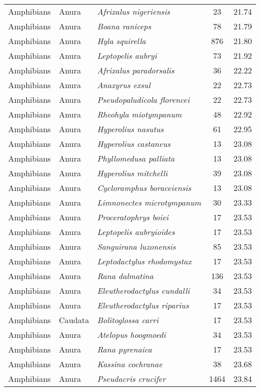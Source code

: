 \begin{longtable}{ll>{\itshape}lcc}
  Amphibians & Anura & Afrixalus nigeriensis &  23 & 21.74 \\ 
  Amphibians & Anura & Boana raniceps &  78 & 21.79 \\ 
  Amphibians & Anura & Hyla squirella & 876 & 21.80 \\ 
  Amphibians & Anura & Leptopelis aubryi &  73 & 21.92 \\ 
  Amphibians & Anura & Afrixalus paradorsalis &  36 & 22.22 \\ 
  Amphibians & Anura & Anaxyrus exsul &  22 & 22.73 \\ 
  Amphibians & Anura & Pseudopaludicola florencei &  22 & 22.73 \\ 
  Amphibians & Anura & Rheohyla miotympanum &  48 & 22.92 \\ 
  Amphibians & Anura & Hyperolius nasutus &  61 & 22.95 \\ 
  Amphibians & Anura & Hyperolius castaneus &  13 & 23.08 \\ 
  Amphibians & Anura & Phyllomedusa palliata &  13 & 23.08 \\ 
  Amphibians & Anura & Hyperolius mitchelli &  39 & 23.08 \\ 
  Amphibians & Anura & Cycloramphus boraceiensis &  13 & 23.08 \\ 
  Amphibians & Anura & Limnonectes microtympanum &  30 & 23.33 \\ 
  Amphibians & Anura & Proceratophrys boiei &  17 & 23.53 \\ 
  Amphibians & Anura & Leptopelis aubryioides &  17 & 23.53 \\ 
  Amphibians & Anura & Sanguirana luzonensis &  85 & 23.53 \\ 
  Amphibians & Anura & Leptodactylus rhodomystax &  17 & 23.53 \\ 
  Amphibians & Anura & Rana dalmatina & 136 & 23.53 \\ 
  Amphibians & Anura & Eleutherodactylus cundalli &  34 & 23.53 \\ 
  Amphibians & Anura & Eleutherodactylus riparius &  17 & 23.53 \\ 
  Amphibians & Caudata & Bolitoglossa carri &  17 & 23.53 \\ 
  Amphibians & Anura & Atelopus hoogmoedi &  34 & 23.53 \\ 
  Amphibians & Anura & Rana pyrenaica &  17 & 23.53 \\ 
  Amphibians & Anura & Kassina cochranae &  38 & 23.68 \\ 
  Amphibians & Anura & Pseudacris crucifer & 1464 & 23.84 \\ 

\end{longtable}
